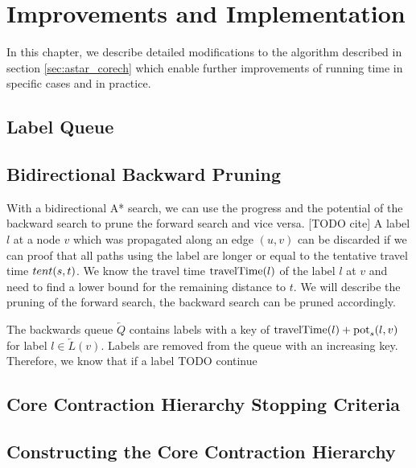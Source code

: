 
\chapter{Improvements and Implementation}
In this chapter, we describe detailed modifications to the algorithm described in section \ref{sec:astar_corech} which enable further improvements of running time in specific cases and in practice.

\section{Label Queue}

\section{Bidirectional Backward Pruning}
With a bidirectional A* search, we can use the progress and the potential of the backward search to prune the forward search and vice versa. [TODO cite] A label $l$ at a node $v$ which was propagated along an edge $(u,v)$ can be discarded if we can proof that all paths using the label are longer or equal to the tentative travel time $tent(s,t)$. We know the travel time $\operatorname{travelTime}(l)$ of the label $l$ at $v$ and need to find a lower bound for the remaining distance to $t$. We will describe the pruning of the forward search, the backward search can be pruned accordingly.

The backwards queue $\overleftarrow{Q}$ contains labels with a key of $\operatorname{travelTime}(l) + \operatorname{pot}_s(l,v)$ for label $l \in \overleftarrow{L}(v)$. Labels are removed from the queue with an increasing key. Therefore, we know that if a label  TODO continue

\section{Core Contraction Hierarchy Stopping Criteria}

\section{Constructing the Core Contraction Hierarchy}
